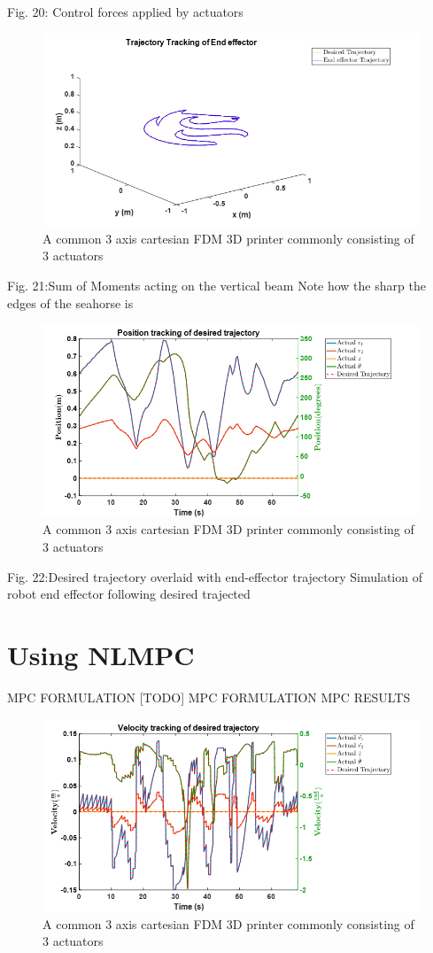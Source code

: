 \documentclass{UoNMCHA}
\numberwithin{equation}{section}
\begin{document}
Fig. 20: Control forces applied by actuators 

\begin{figure}[H]
	\begin{center}
		\includegraphics[width=.5\linewidth]{figs/Picture32}
		\caption{A  common 3 axis cartesian FDM 3D printer commonly consisting of 3 actuators}
		\label{figs/Picture32}
	\end{center}
\end{figure}

Fig. 21:Sum of Moments acting on the vertical beam
Note how the sharp the edges of the seahorse is

\begin{figure}[H]
	\begin{center}
		\includegraphics[width=.5\linewidth]{figs/Picture33}
		\caption{A  common 3 axis cartesian FDM 3D printer commonly consisting of 3 actuators}
		\label{figs/Picture33}
	\end{center}
\end{figure}

Fig. 22:Desired trajectory overlaid with end-effector trajectory
Simulation of robot end effector following desired trajected

\section{Using NLMPC}

MPC FORMULATION
[TODO] MPC FORMULATION
MPC RESULTS

\begin{figure}[H]
	\begin{center}
		\includegraphics[width=.5\linewidth]{figs/Picture34}
		\caption{A  common 3 axis cartesian FDM 3D printer commonly consisting of 3 actuators}
		\label{figs/Picture34}
	\end{center}
\end{figure}
\end{document}
